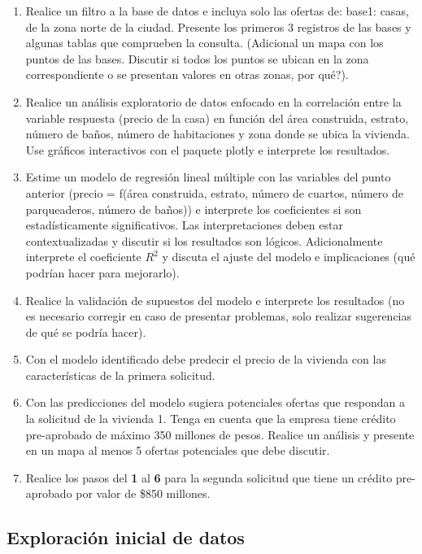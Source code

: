 \documentclass[
]{article}
\begin{document}
\begin{enumerate}
\def\labelenumi{\arabic{enumi}.}
\item
  Realice un filtro a la base de datos e incluya solo las ofertas de:
  base1: casas, de la zona norte de la ciudad. Presente los primeros 3
  registros de las bases y algunas tablas que comprueben la consulta.
  (Adicional un mapa con los puntos de las bases. Discutir si todos los
  puntos se ubican en la zona correspondiente o se presentan valores en
  otras zonas, por qué?).
\item
  Realice un análisis exploratorio de datos enfocado en la correlación
  entre la variable respuesta (precio de la casa) en función del área
  construida, estrato, número de baños, número de habitaciones y zona
  donde se ubica la vivienda. Use gráficos interactivos con el paquete
  plotly e interprete los resultados.
\item
  Estime un modelo de regresión lineal múltiple con las variables del
  punto anterior (precio = f(área construida, estrato, número de
  cuartos, número de parqueaderos, número de baños)) e interprete los
  coeficientes si son estadísticamente significativos. Las
  interpretaciones deben estar contextualizadas y discutir si los
  resultados son lógicos. Adicionalmente interprete el coeficiente
  \(R^2\) y discuta el ajuste del modelo e implicaciones (qué podrían
  hacer para mejorarlo).
\item
  Realice la validación de supuestos del modelo e interprete los
  resultados (no es necesario corregir en caso de presentar problemas,
  solo realizar sugerencias de qué se podría hacer).
\item
  Con el modelo identificado debe predecir el precio de la vivienda con
  las características de la primera solicitud.
\item
  Con las predicciones del modelo sugiera potenciales ofertas que
  respondan a la solicitud de la vivienda 1. Tenga en cuenta que la
  empresa tiene crédito pre-aprobado de máximo 350 millones de pesos.
  Realice un análisis y presente en un mapa al menos 5 ofertas
  potenciales que debe discutir.
\item
  Realice los pasos del \textbf{1} al \textbf{6} para la segunda
  solicitud que tiene un crédito pre-aprobado por valor de \$850
  millones.
\end{enumerate}

\subsection{\texorpdfstring{\textbf{Exploración inicial de
datos}}{Exploración inicial de datos}}\label{exploraciuxf3n-inicial-de-datos}
\end{document}
